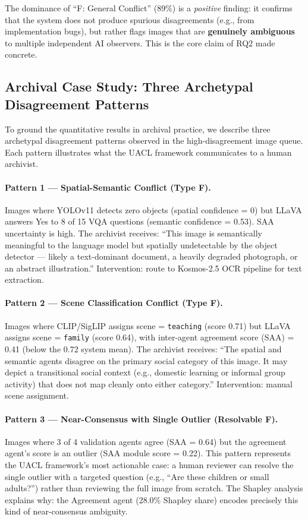 \documentclass[12pt,onecolumn,a4paper]{IEEEtran}
\begin{document}
The dominance of ``F: General Conflict'' (89\%) is a \textit{positive} finding: it confirms that the system does not produce spurious disagreements (e.g., from implementation bugs), but rather flags images that are \textbf{genuinely ambiguous} to multiple independent AI observers. This is the core claim of RQ2 made concrete.

\subsection{Archival Case Study: Three Archetypal Disagreement Patterns}
\label{sec:case_study}

To ground the quantitative results in archival practice, we describe three archetypal disagreement patterns observed in the high-disagreement image queue. Each pattern illustrates what the UACL framework communicates to a human archivist.

\paragraph{Pattern 1 --- Spatial-Semantic Conflict (Type F).}
Images where YOLOv11 detects zero objects (spatial confidence = 0) but LLaVA answers Yes to 8 of 15 VQA questions (semantic confidence = 0.53). SAA uncertainty is high. The archivist receives: ``This image is semantically meaningful to the language model but spatially undetectable by the object detector --- likely a text-dominant document, a heavily degraded photograph, or an abstract illustration.'' Intervention: route to Kosmos-2.5 OCR pipeline for text extraction.

\paragraph{Pattern 2 --- Scene Classification Conflict (Type F).}
Images where CLIP/SigLIP assigns scene = \texttt{teaching} (score 0.71) but LLaVA assigns scene = \texttt{family} (score 0.64), with inter-agent agreement score (SAA) = 0.41 (below the 0.72 system mean). The archivist receives: ``The spatial and semantic agents disagree on the primary social category of this image. It may depict a transitional social context (e.g., domestic learning or informal group activity) that does not map cleanly onto either category.'' Intervention: manual scene assignment.

\paragraph{Pattern 3 --- Near-Consensus with Single Outlier (Resolvable F).}
Images where 3 of 4 validation agents agree (SAA = 0.64) but the agreement agent's score is an outlier (SAA module score = 0.22). This pattern represents the UACL framework's most actionable case: a human reviewer can resolve the single outlier with a targeted question (e.g., ``Are these children or small adults?'') rather than reviewing the full image from scratch. The Shapley analysis explains why: the Agreement agent (28.0\% Shapley share) encodes precisely this kind of near-consensus ambiguity.
\end{document}
